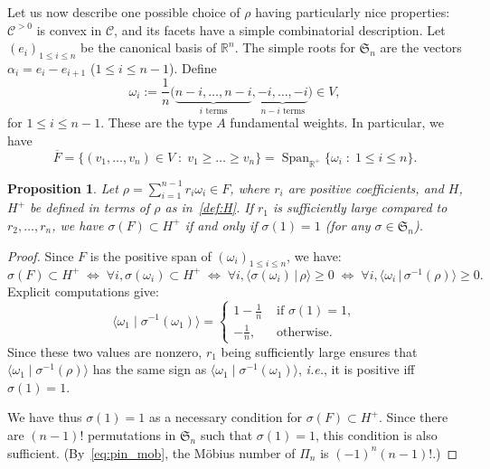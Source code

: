 \documentclass[11pt]{article}
\newtheorem{prop}[theo]{Proposition}
\theoremstyle{definition}
\DeclareMathOperator{\Span}{Span}
\newcommand{\CC}{\mathcal{C}}
\newcommand{\CCP}{\mathcal{C}^{>0}}
\begin{document}
Let us now describe one possible choice of $\rho$ having particularly nice properties: $\CCP$ is convex in $\CC$, and its facets have a simple combinatorial description.  Let $(e_i)_{1\leq i \leq n}$ be the canonical basis of $\mathbb{R}^{n}$.  The simple roots for $\mathfrak{S}_n$ are the vectors $\alpha_i = e_i - e_{i+1}$ ($1\leq i \leq n-1$). Define
\[
    \omega_i := \frac{1}{n} \Big( \underbrace{n-i,\dots,n-i}_\text{$i$ terms},
    \underbrace{-i,\dots,-i}_\text{$n-i$ terms} \Big) \in V,
\]
for $1\leq i \leq n-1$.  These are the type $A$ fundamental weights.  In particular, we have
\[
    \overline{F}
        =
    \Big\{ (v_1 , \dots, v_n) \in V \;:\; v_1 \geq \dots \geq v_n \Big\}
        =
    \Span_{\mathbb{R}^+} \Big\{ \omega_i \;:\; 1\leq i \leq n\Big\}.
\]


\begin{prop} \label{prop:CCP_Sn}
    Let $\rho = \sum_{i=1}^{n-1} r_i \omega_i \in F$,
    where $r_i$ are positive coefficients, and $H$, $H^+$ be defined in terms of $\rho$ as in~\eqref{def:H}.  If $r_1$ is sufficiently large compared to $r_2,\dots,r_n$, we have $\sigma(F) \subset H^+$ if and only if $\sigma(1) = 1$ (for any $\sigma \in \mathfrak{S}_n$).
\end{prop}

\begin{proof}
    Since $F$ is the positive span of $(\omega_i)_{1\leq i \leq n}$, we have:
    \[
        \sigma(F) \subset H^+ 
            \;\Longleftrightarrow\;
        \forall i, \sigma(\omega_i) \subset H^+
            \;\Longleftrightarrow\;
        \forall i, \langle \sigma(\omega_i) \,|\, \rho \rangle \geq 0
            \;\Longleftrightarrow\;
        \forall i, \langle \omega_i \,|\, \sigma^{-1}(\rho) \rangle \geq 0.
    \]
    Explicit computations give:
    \[
        \langle \omega_1 \;|\; \sigma^{-1}(\omega_1) \rangle
            =
        \begin{cases}
             1 - \frac{1}{n} & \text{ if } \sigma(1)=1, \\
             -\frac{1}{n}, & \text{ otherwise.}
        \end{cases}
    \]
    Since these two values are nonzero, $r_1$ being sufficiently large ensures that $\langle \omega_1 \; | \; \sigma^{-1}(\rho) \rangle$ has the same sign as $\langle \omega_1 \;|\; \sigma^{-1}(\omega_1) \rangle$, {\it i.e.}, it is positive iff $\sigma(1)=1$.

    We have thus $\sigma(1)=1$ as a necessary condition for $\sigma(F) \subset H^+$.  Since there are $(n-1)!$ permutations in $\mathfrak{S}_n$ such that $\sigma(1)=1$, this condition is also sufficient.  (By~\eqref{eq:pin_mob}, the Möbius number of $\Pi_n$ is $(-1)^n (n-1)!$.)
\end{proof}
\end{document}
